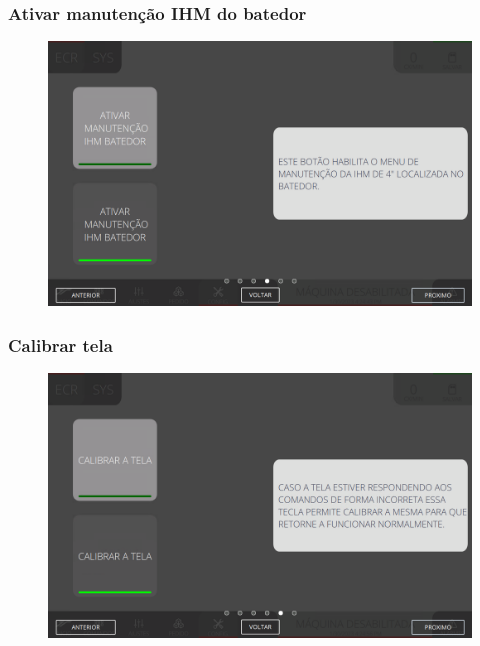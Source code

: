 \newpage
\thispagestyle{fancy}
\vspace*{40 pt}
\subsubsection{\small{Ativar manutenção IHM do batedor}} \label{sec:telaConfiguracaoTelaAtivarManutencaoIHMdoBatedor}
\vspace*{\fill}
\begin{figure}[h]
    \centering
    \includegraphics[width=576 px,height=360 px]{src/imagesICV/10-configuration/4.png}
\end{figure}
\vspace*{\fill}

\newpage
\thispagestyle{fancy}
\vspace*{40 pt}
\subsubsection{\small{Calibrar tela}} \label{sec:telaConfiguracaoTelaCalibrarTela}
\vspace*{\fill}
\begin{figure}[h]
    \centering
    \includegraphics[width=576 px,height=360 px]{src/imagesICV/10-configuration/5.png}
\end{figure}
\vspace*{\fill}

